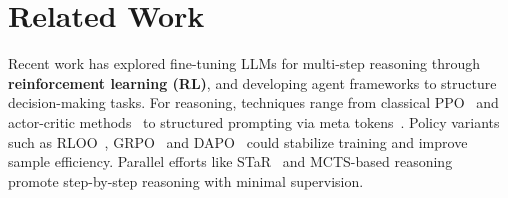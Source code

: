 

\section{Related Work}
Recent work has explored fine-tuning LLMs for multi-step reasoning through \textbf{reinforcement learning (RL)}, and developing agent frameworks to structure decision-making tasks. For reasoning, techniques range from classical PPO~\citep{schulman2017proximalpolicyoptimizationalgorithms} and actor-critic methods~\citep{haarnoja2018softactorcritic} to structured prompting via meta tokens~\citep{goyal2024thinkspeaktraininglanguage, herel2024thinkingtokenslanguagemodeling}. Policy variants such as RLOO~\citep{rloo}, GRPO~\citep{deepseekai2025deepseekr1incentivizingreasoningcapability} and DAPO~\citep{yu2025DAPO} could stabilize training and improve sample efficiency. Parallel efforts like STaR~\citep{Zelikman2022STaR} and MCTS-based reasoning~\citep{hao2023reasoning} promote step-by-step reasoning with minimal supervision. 

